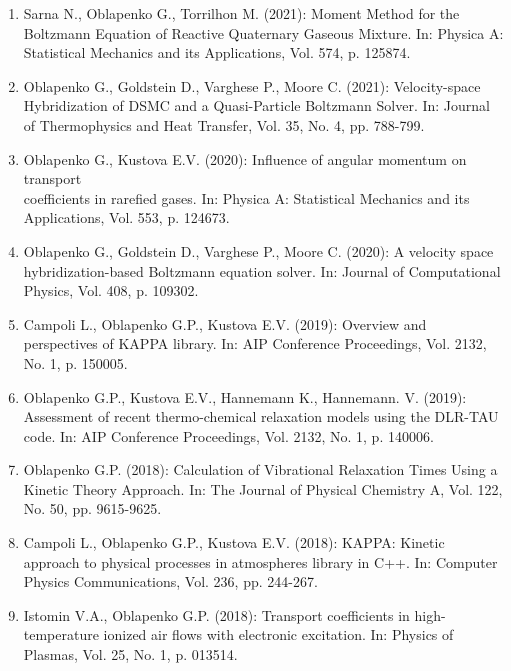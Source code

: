 \documentclass{resume} %
\begin{document}
\begin{enumerate}


\item Sarna N., Oblapenko G., Torrilhon M. (2021): Moment Method for the Boltzmann Equation of Reactive Quaternary Gaseous Mixture. In: Physica A: Statistical Mechanics and its Applications, Vol. 574, p. 125874.

\item {Oblapenko G.}, Goldstein D., Varghese P., Moore C. (2021): Velocity-space Hybridization of DSMC and a Quasi-Particle Boltzmann Solver. In: Journal of Thermophysics and Heat Transfer, Vol. 35, No. 4, pp. 788-799.

\item {Oblapenko G.}, Kustova E.V. (2020): Influence of angular momentum on transport\\ coefficients in rarefied gases. In: Physica A: Statistical Mechanics and its Applications, Vol. 553, p. 124673.

\item {Oblapenko G.}, Goldstein D., Varghese P., Moore C. (2020): A velocity space hybridization-based Boltzmann equation solver. In: Journal of Computational Physics, Vol. 408, p. 109302.

\item {Campoli L., {Oblapenko G.P.}, Kustova E.V.} (2019): Overview and perspectives of KAPPA library. In: AIP Conference Proceedings, Vol. 2132, No. 1, p. 150005.

\item {{Oblapenko G.P.}, Kustova E.V., Hannemann K., Hannemann. V.} (2019): Assessment of recent thermo-chemical relaxation models using the DLR-TAU code. In: AIP Conference Proceedings, Vol. 2132, No. 1, p. 140006.

\item {{Oblapenko G.P.}} (2018): Calculation of Vibrational Relaxation Times Using a Kinetic Theory Approach. In: The Journal of Physical Chemistry A, Vol. 122, No. 50, pp. 9615-9625.

\item {Campoli L., {Oblapenko G.P.}, Kustova E.V.} (2018): KAPPA: Kinetic approach to physical processes in atmospheres library in C++. In: Computer Physics Communications, Vol. 236, pp. 244-267.

\item {Istomin V.A., {Oblapenko G.P.}} (2018): Transport coefficients in high-temperature ionized air flows with electronic excitation. In: Physics of Plasmas, Vol. 25, No. 1, p. 013514.


\end{enumerate}
\end{document}
